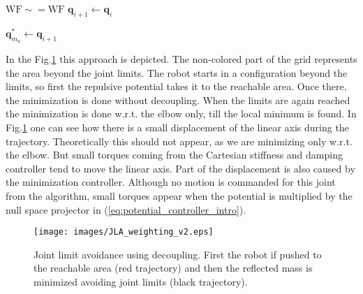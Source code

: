 \begin{algorithm}[H]
\begin{algorithmic}[1]
		
		

		
		\Else
		
		\State $\mathrm{WF \sim= WF }$ 
		\State $\mathbf{q}_{i+1} \leftarrow \mathbf{q}_i$
		
		\EndIf
		
		
		
		
		\EndIf
		
		\State $\mathbf{q}_{m_u}^\ast \leftarrow \mathbf{q}_{i+1}$ 
		
		\EndFor
	\end{algorithmic}
\end{algorithm}



  In the Fig.\ref{fig:wf_for_jla} this approach is depicted. The non-colored part of the grid represents the area beyond the joint limits. The robot starts in a configuration beyond the limits, so first the repulsive potential takes it to the reachable area. Once there, the minimization is done without decoupling. When the limits are again reached the minimization is done w.r.t. the elbow only, till the local minimum is found. In Fig.\ref{fig:wf_for_jla} one can see how there is a  small displacement of the linear axis during the trajectory. Theoretically this should not appear, as we are minimizing only w.r.t. the elbow. But small torques coming from the Cartesian stiffness and damping controller tend to move the linear axis. Part of the displacement is also caused by the minimization controller. Although no motion is commanded for this joint from the algorithm, small torques appear when the potential is multiplied by the null space projector in (\ref{eq:potential_controller_intro}).



\begin{figure}[!htb]
	\centerline{
		\texttt{[image: images/JLA\_weighting\_v2.eps]}}
	\caption{Joint limit avoidance using decoupling. First the robot if pushed to the reachable area (red trajectory) and then the reflected mass is minimized avoiding joint limits (black trajectory).}
	\label{fig:wf_for_jla}
\end{figure}




